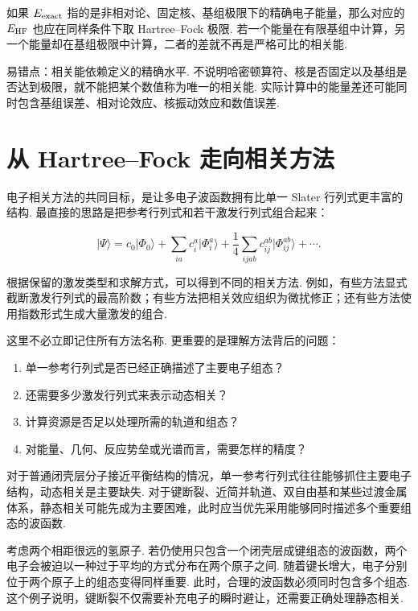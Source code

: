 \documentclass[UTF8,11pt,a4paper,openany]{ctexbook}
\newcommand{\ket}[1]{\lvert #1\rangle}\newcommand{\bra}[1]{\langle #1\rvert}
\begin{document}
如果 $E_{\rm exact}$ 指的是非相对论、固定核、基组极限下的精确电子能量，那么对应的 $E_{\rm HF}$ 也应在同样条件下取 Hartree--Fock 极限. 若一个能量在有限基组中计算，另一个能量却在基组极限中计算，二者的差就不再是严格可比的相关能. 

\begin{limitbox}
易错点：相关能依赖定义的精确水平. 不说明哈密顿算符、核是否固定以及基组是否达到极限，就不能把某个数值称为唯一的相关能. 实际计算中的能量差还可能同时包含基组误差、相对论效应、核振动效应和数值误差. 
\end{limitbox}

\section{从 Hartree--Fock 走向相关方法}

电子相关方法的共同目标，是让多电子波函数拥有比单一 Slater 行列式更丰富的结构. 最直接的思路是把参考行列式和若干激发行列式组合起来：

\[
\ket{\Psi}
=
c_0\ket{\Phi_0}
+
\sum_{ia}c_i^a\ket{\Phi_i^a}
+
\frac{1}{4}\sum_{ijab}c_{ij}^{ab}\ket{\Phi_{ij}^{ab}}
+\cdots.
\]

根据保留的激发类型和求解方式，可以得到不同的相关方法. 例如，有些方法显式截断激发行列式的最高阶数；有些方法把相关效应组织为微扰修正；还有些方法使用指数形式生成大量激发的组合. 

这里不必立即记住所有方法名称. 更重要的是理解方法背后的问题：

\begin{enumerate}
\item 单一参考行列式是否已经正确描述了主要电子组态？
\item 还需要多少激发行列式来表示动态相关？
\item 计算资源是否足以处理所需的轨道和组态？
\item 对能量、几何、反应势垒或光谱而言，需要怎样的精度？
\end{enumerate}

对于普通闭壳层分子接近平衡结构的情况，单一参考行列式往往能够抓住主要电子结构，动态相关是主要缺失. 对于键断裂、近简并轨道、双自由基和某些过渡金属体系，静态相关可能先成为主要困难，此时应当优先采用能够同时描述多个重要组态的波函数. 

\begin{examplebox}
考虑两个相距很远的氢原子. 若仍使用只包含一个闭壳层成键组态的波函数，两个电子会被迫以一种过于平均的方式分布在两个原子之间. 随着键长增大，电子分别位于两个原子上的组态变得同样重要. 此时，合理的波函数必须同时包含多个组态. 这个例子说明，键断裂不仅需要补充电子的瞬时避让，还需要正确处理静态相关. 
\end{examplebox}
\end{document}

